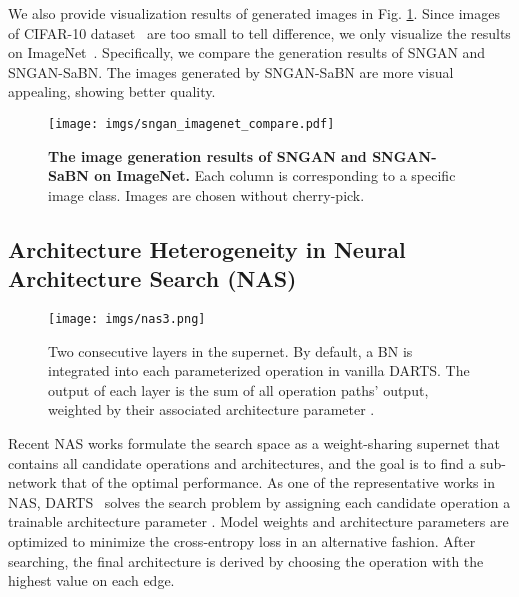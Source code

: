 \documentclass{article}
\begin{document}
We also provide visualization results of generated images in Fig. \ref{fig:gan_vis}. 
Since images of CIFAR-10 dataset~\cite{krizhevsky2009learning} are too small to tell difference, we only visualize the results on ImageNet~\cite{deng2009imagenet}. Specifically, we compare the generation results of SNGAN and SNGAN-SaBN. The images generated by SNGAN-SaBN are more visual appealing, showing better quality.
\begin{figure}[t!]
\begin{center}
 \texttt{[image: imgs/sngan\_imagenet\_compare.pdf]}
\end{center}
\vspace{-1em}
   \caption{\textbf{The image generation results of SNGAN and SNGAN-SaBN on ImageNet.} Each column is corresponding to a specific image class. Images are chosen without cherry-pick.}
\label{fig:gan_vis}
\end{figure}
 \subsection{Architecture Heterogeneity in Neural Architecture Search (NAS)}
\begin{figure}[t!]
\begin{center}
\texttt{[image: imgs/nas3.png]}
\end{center}
  \caption{Two consecutive layers in the supernet. By default, a BN is integrated into each parameterized operation in vanilla DARTS. The output of each layer is the sum of all operation paths' output, weighted by their associated architecture parameter . 
  }
\label{fig:supernet}
\end{figure}
Recent NAS works formulate the search space as a weight-sharing supernet that contains all candidate operations and architectures, and the goal is to find a sub-network that of the optimal performance. As one of the representative works in NAS, DARTS~\citep{liu2018darts} solves the search problem by assigning each candidate operation a trainable architecture parameter . Model weights  and architecture parameters  are optimized to minimize the cross-entropy loss in an alternative fashion. After searching, the final architecture is derived by choosing the operation with the highest  value on each edge.
\end{document}
